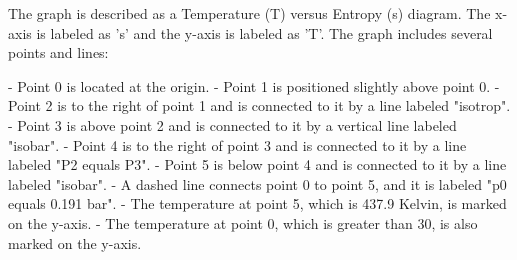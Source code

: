 The graph is described as a Temperature (T) versus Entropy (s) diagram. The x-axis is labeled as 's' and the y-axis is labeled as 'T'. The graph includes several points and lines:

- Point 0 is located at the origin.
- Point 1 is positioned slightly above point 0.
- Point 2 is to the right of point 1 and is connected to it by a line labeled "isotrop".
- Point 3 is above point 2 and is connected to it by a vertical line labeled "isobar".
- Point 4 is to the right of point 3 and is connected to it by a line labeled "P2 equals P3".
- Point 5 is below point 4 and is connected to it by a line labeled "isobar".
- A dashed line connects point 0 to point 5, and it is labeled "p0 equals 0.191 bar".
- The temperature at point 5, which is 437.9 Kelvin, is marked on the y-axis.
- The temperature at point 0, which is greater than 30, is also marked on the y-axis.